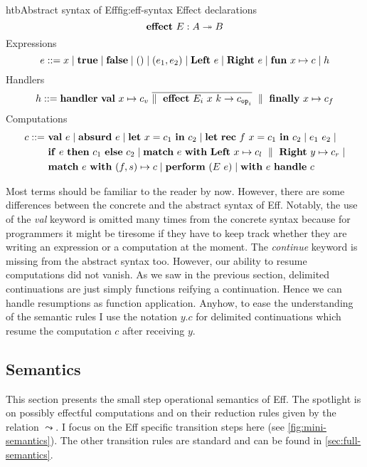 \documentclass[class=article, crop=false]{standalone}
\begin{document}
\begin{myfigure}[.9]{htb}{Abstract syntax of Eff}{fig:eff-syntax}
Effect declarations
$$ \mathbf{effect}\  E : A \twoheadrightarrow B $$
%
Expressions
$$ e ::= x \mid
  \mathbf{true} \mid
  \mathbf{false} \mid
  () \mid
  (e_1, e_2) \mid
  \mathbf{Left}\  e \mid
  \mathbf{Right\ } e \mid
  \mathbf{fun}\  x \mapsto c \mid
  h $$
%
Handlers
$$ h ::= \mathbf{handler}\  \mathbf{val}\  x \mapsto c_v\ \overline{\parallel \ \mathbf{effect}\  E_i\ x\ k \to c_{\mathtt{op}_i} } \ \parallel \  \mathbf{finally}\  x \mapsto c_f $$
%
Computations
\begin{align*}
  c ::= \ &\mathbf{val}\  e \mid \mathbf{absurd}\  e \mid
    \mathbf{let}\  x = c_1 \ \mathbf{in}\  c_2 \mid
    \mathbf{let}\  \mathbf{rec}\  f\ x = c_1 \ \mathbf{in}\  c_2 \mid e_1\ e_2 \mid \\
    & \mathbf{if}\  e \ \mathbf{then}\  c_1 \ \mathbf{else}\  c_2 \mid
    \mathbf{match}\  e\ \mathbf{with}\  \mathbf{Left}\  x \mapsto c_l \ \parallel \  \mathbf{Right\ } y \mapsto c_r \mid\\
    & \mathbf{match}\  e\ \mathbf{with}\  (f, s) \mapsto c \mid \mathbf{perform}\  (E\ e) \mid
    \mathbf{with}\  e \ \mathbf{handle}\  c
\end{align*}
\end{myfigure}

Most terms should be familiar to the reader by now. However, there are some
differences between the concrete and the abstract syntax of Eff. Notably, the
use of the \emph{val} keyword is omitted many times from the concrete syntax
because for programmers it might be tiresome if they have to keep track whether
they are writing an expression or a computation at the moment. The
\emph{continue} keyword is missing from the abstract syntax too. However, our
ability to resume computations did not vanish. As we saw in the previous section,
delimited continuations are just simply functions reifying a continuation. Hence
we can handle resumptions as function application. Anyhow, to ease the
understanding of the semantic rules I use the notation $y.c$ for delimited
continuations which resume the computation $c$ after receiving $y$.

\subsection{Semantics}

This section presents the small step operational semantics of Eff. The spotlight
is on possibly effectful computations and on their reduction rules given by the
relation $\leadsto$. I focus on the Eff specific transition steps here (see
\autoref{fig:mini-semantics}). The other transition rules are standard and can
be found in \autoref{sec:full-semantics}.
\end{document}
